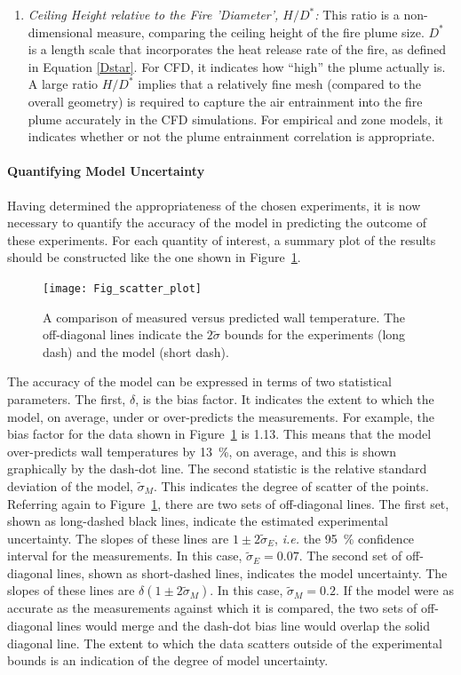 \documentclass[graybox]{svmult}
\begin{document}
\begin{enumerate}
\item {\em Ceiling Height relative to the Fire 'Diameter', $H/D^*$:}
This ratio is a non-dimensional measure, comparing the ceiling height of the fire plume size. $D^*$ is a length scale that incorporates the heat release rate of the fire, as defined in Equation \ref{Dstar}. For CFD, it indicates how ``high'' the plume actually is. A large ratio $H/D^*$ implies that a relatively fine mesh (compared to the overall geometry) is required to capture the air entrainment into the fire plume accurately in the CFD simulations. For empirical and zone models, it indicates whether or not the plume entrainment correlation is appropriate. 
\end{enumerate}


\paragraph{Quantifying Model Uncertainty}

Having determined the appropriateness of the chosen experiments, it is now necessary to quantify the accuracy of the model in predicting the outcome of these experiments. For each quantity of interest, a summary plot of the results should be constructed like the one shown in Figure~\ref{scatterplot}.
\begin{figure}[ht]
\texttt{[image: Fig\_scatter\_plot]}
\caption{A comparison of measured versus predicted wall temperature. The off-diagonal lines indicate the $2 \widetilde{\sigma}$ bounds for the experiments (long dash) and the model (short dash).}
\label{scatterplot}
\end{figure}
The accuracy of the model can be expressed in terms of two statistical parameters. The first, $\delta$, is the bias factor. It indicates the extent to which the model, on average, under or over-predicts the measurements. For example, the bias factor for the data shown in Figure~\ref{scatterplot} is 1.13. This means that the model over-predicts wall temperatures by 13~\%, on average, and this is shown graphically by the dash-dot line. The second statistic is the relative standard deviation of the model, $\widetilde{\sigma}_M$. This indicates the degree of scatter of the points. Referring again to Figure~\ref{scatterplot}, there are two sets of off-diagonal lines. The first set, shown as long-dashed black lines, indicate the estimated experimental uncertainty. The slopes of these lines are $1\pm 2 \widetilde{\sigma}_E$, {\em i.e.} the 95~\% confidence interval for the measurements. In this case, $\widetilde{\sigma}_E=0.07$. The second set of off-diagonal lines, shown as short-dashed lines, indicates the model uncertainty. The slopes of these lines are $\delta (1\pm 2 \widetilde{\sigma}_M)$. In this case, $\widetilde{\sigma}_M=0.2$. If the model were as accurate as the measurements against which it is compared, the two sets of off-diagonal lines would merge and the dash-dot bias line would overlap the solid diagonal line. The extent to which the data scatters outside of the experimental bounds is an indication of the degree of model uncertainty.
\end{document}
